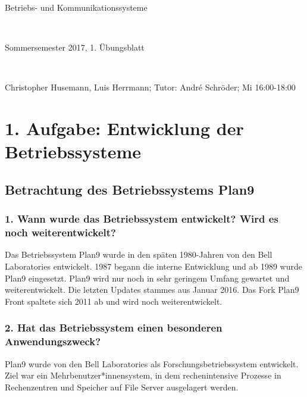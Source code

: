 \documentclass[numbers=noendperiod]{scrartcl}
\begin{document}
	
\newcommand{\inputmintedframed}[2]{
	\begin{mdframed}[linecolor=bg,backgroundcolor=bg]
		\inputminted[mathescape,breaklines,linenos,numbersep=5pt,tabsize=3]{#1}{#2}
	\end{mdframed}}
	
\hrulefill
\begin{center}
	\bfseries %
	\sffamily %
	\begin{huge}
		Betriebs- und Kommunikationssysteme
	\end{huge}\\
	\begin{Large}
		Sommersemester 2017, 1. Übungsblatt
	\end{Large}\\
	\begin{small}
		Christopher Husemann, Luis Herrmann; Tutor: André Schröder; Mi 16:00-18:00
	\end{small}
	
	\vspace{-10pt}
\end{center}
\hrulefill

\section*{1. Aufgabe: Entwicklung der Betriebssysteme}
\subsection*{Betrachtung des Betriebssystems Plan9}

\subsubsection*{1. Wann wurde das Betriebssystem entwickelt? Wird es noch weiterentwickelt?}
Das Betriebssystem Plan9 wurde in den späten 1980-Jahren von den Bell Laboratories entwickelt. 1987 begann die interne Entwicklung und ab 1989 wurde Plan9 eingesetzt. Plan9 wird nur noch in sehr geringem Umfang gewartet und weiterentwickelt. Die letzten Updates stammes aus Januar 2016. Das Fork Plan9 Front spaltete sich 2011 ab und wird noch weiterentwickelt.

\subsubsection*{2. Hat das Betriebssystem einen besonderen Anwendungszweck?}
Plan9 wurde von den Bell Laboratories als Forschungsbetriebssystem entwickelt. Ziel war ein Mehrbenutzer*innensystem, in dem rechenintensive Prozesse in Rechenzentren und Speicher auf File Server ausgelagert werden. 
\end{document}
